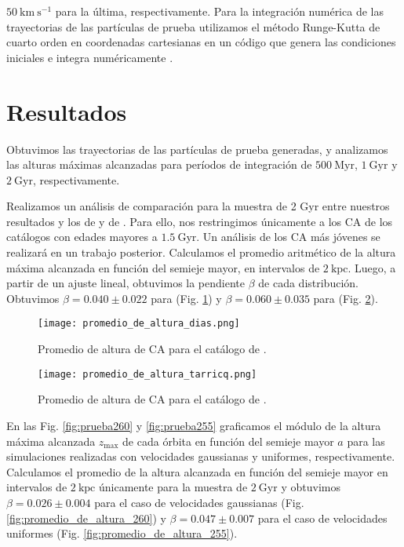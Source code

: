 \documentclass[baaa]{baaa}
\begin{document}
$50~\mathrm{km~s^{-1}}$ para la última, respectivamente. Para la integración numérica de las trayectorias de las partículas de prueba utilizamos el método Runge-Kutta de cuarto orden en coordenadas cartesianas en un código que genera las condiciones iniciales e integra numéricamente \citep{Numerical_Recipes}. 

\section{Resultados}\label{Resultados}

Obtuvimos las trayectorias de las partículas de prueba generadas, y analizamos las alturas máximas alcanzadas para períodos de integración de $500~\mathrm{Myr}$, $1~\mathrm{Gyr}$ y $2~\mathrm{Gyr}$, respectivamente.   

Realizamos un análisis de comparación para la muestra de 2 Gyr entre nuestros resultados y los de \cite{Dias} y de \cite{Tarricq}. Para ello, nos restringimos únicamente a los CA de los catálogos con edades mayores a $1.5~\mathrm{Gyr}$. Un análisis de los CA más jóvenes se realizará en un trabajo posterior. Calculamos el promedio aritmético de la altura máxima alcanzada en función del semieje mayor, en intervalos de $2~\mathrm{kpc}$. Luego, a partir de un ajuste lineal, obtuvimos la pendiente $\beta$ de cada distribución. Obtuvimos $\beta = 0.040 \pm 0.022$ para \cite{Dias} (Fig. \ref{fig:promedio_dias}) y $\beta = 0.060 \pm 0.035$ para \cite{Tarricq} (Fig. \ref{fig:promedio_tarricq}).

\begin{figure}[!h]
    \centering
    \texttt{[image: promedio\_de\_altura\_dias.png]}
    \caption{Promedio de altura de CA para el catálogo de \cite{Dias}.}
    \label{fig:promedio_dias}
\end{figure}

\begin{figure}[!h]
    \centering
    \texttt{[image: promedio\_de\_altura\_tarricq.png]}
    \caption{Promedio de altura de CA para el catálogo de \cite{Tarricq}.}
    \label{fig:promedio_tarricq}
\end{figure}

En las Fig. \ref{fig:prueba260} y \ref{fig:prueba255} graficamos el módulo de la altura máxima alcanzada $z_{\mathrm{max}}$ de cada órbita en función del semieje mayor $a$ para las simulaciones realizadas con velocidades gaussianas y uniformes, respectivamente. Calculamos el promedio de la altura alcanzada en función del semieje mayor en intervalos de $2~\mathrm{kpc}$ únicamente para la muestra de $2~\mathrm{Gyr}$ y obtuvimos $\beta = 0.026 \pm 0.004$ para el caso de velocidades gaussianas (Fig. \ref{fig:promedio_de_altura_260}) y $\beta = 0.047 \pm 0.007$ para el caso de velocidades uniformes (Fig. \ref{fig:promedio_de_altura_255}).
\end{document}
